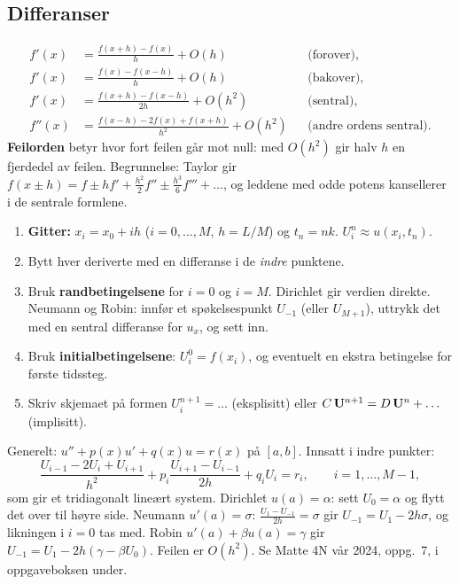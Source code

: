 

\subsection{Differanser}
\begin{formel}
\begin{align*}
f'(x)&=\frac{f(x+h)-f(x)}h+O(h) && \text{(forover)},\\
f'(x)&=\frac{f(x)-f(x-h)}h+O(h) && \text{(bakover)},\\
f'(x)&=\frac{f(x+h)-f(x-h)}{2h}+O(h^2) && \text{(sentral)},\\
f''(x)&=\frac{f(x-h)-2f(x)+f(x+h)}{h^2}+O(h^2) && \text{(andre ordens sentral)}.
\end{align*}
\textbf{Feilorden} betyr hvor fort feilen går mot null: med $O(h^2)$ gir halv $h$ en fjerdedel av feilen. Begrunnelse: Taylor gir $f(x\pm h)=f\pm hf'+\frac{h^2}2f''\pm\frac{h^3}6f'''+\dots$, og leddene med odde potens kansellerer i de sentrale formlene.
\end{formel}

\begin{oppskrift}
\begin{enumerate}
  \item \textbf{Gitter:} $x_i=x_0+ih$ ($i=0,\dots,M$, $h=L/M$) og $t_n=nk$. $U_i^n\approx u(x_i,t_n)$.
  \item Bytt hver deriverte med en differanse i de \emph{indre} punktene.
  \item Bruk \textbf{randbetingelsene} for $i=0$ og $i=M$. Dirichlet gir verdien direkte. Neumann og Robin: innfør et spøkelsespunkt $U_{-1}$ (eller $U_{M+1}$), uttrykk det med en sentral differanse for $u_x$, og sett inn.
  \item Bruk \textbf{initialbetingelsene}: $U_i^0=f(x_i)$, og eventuelt en ekstra betingelse for første tidssteg.
  \item Skriv skjemaet på formen $U_i^{n+1}=\dots$ (eksplisitt) eller $C\,\mathbf{U}^{n+1}=D\,\mathbf{U}^n+\dots$ (implisitt).
\end{enumerate}
\end{oppskrift}

\begin{formel}
Generelt: $u''+p(x)u'+q(x)u=r(x)$ på $[a,b]$. Innsatt i indre punkter:
\[
\frac{U_{i-1}-2U_i+U_{i+1}}{h^2}+p_i\frac{U_{i+1}-U_{i-1}}{2h}+q_iU_i=r_i,\qquad i=1,\dots,M-1,
\]
som gir et tridiagonalt lineært system. Dirichlet $u(a)=\alpha$: sett $U_0=\alpha$ og flytt det over til høyre side. Neumann $u'(a)=\sigma$: $\frac{U_1-U_{-1}}{2h}=\sigma$ gir $U_{-1}=U_1-2h\sigma$, og likningen i $i=0$ tas med. Robin $u'(a)+\beta u(a)=\gamma$ gir $U_{-1}=U_1-2h(\gamma-\beta U_0)$. Feilen er $O(h^2)$. Se Matte 4N vår 2024, oppg.~7, i oppgaveboksen under.
\end{formel}

